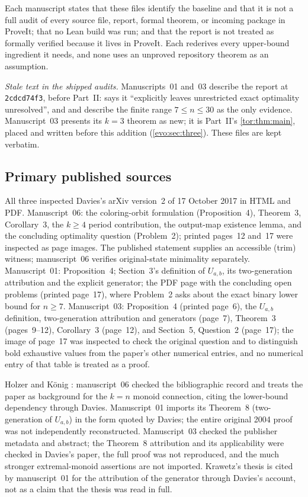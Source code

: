 \documentclass[11pt,a4paper]{article}
\numberwithin{equation}{section}
\theoremstyle{definition}
\theoremstyle{remark}
\begin{document}
Each manuscript states that these files identify the baseline and that it is
not a full audit of every source file, report, formal theorem, or incoming
package in ProveIt; that no Lean build was run; and that the report is not
treated as formally verified because it lives in ProveIt. Each rederives
every upper-bound ingredient it needs, and none uses an unproved repository
theorem as an assumption.

\emph{Stale text in the shipped audits.} Manuscripts~01 and~03 describe the
report at \texttt{2cdcd74f3}, before Part~II: 
says it ``explicitly leaves unrestricted exact optimality unresolved'', and
 and  describe
the finite range $7\le n\le30$ as the only evidence. Manuscript~03 presents
its $k=3$ theorem as new; it is Part~II's \cref{tor:thm:main}, placed and
written before this addition (\cref{evo:sec:three}). These files are kept
verbatim.

\subsection{Primary published sources}

All three inspected Davies's arXiv version~2 of 17 October 2017
\cite{Davies2017} in HTML and PDF. Manuscript~06: the coloring-orbit
formulation (Proposition~4), Theorem~3, Corollary~3, the $k\ge4$ period
contribution, the output-map existence lemma, and the concluding optimality
question (Problem~2); printed pages~12 and~17 were inspected as page images.
The published statement supplies an accessible (trim) witness; manuscript~06
verifies original-state minimality separately. Manuscript~01: Proposition~4;
Section~3's definition of $U_{a,b}$, its two-generation attribution and the
explicit generator; the PDF page with the concluding open problems (printed
page~17), where Problem~2 asks about the exact binary lower bound for
$n\ge7$. Manuscript~03: Proposition~4 (printed page~6), the $U_{a,b}$
definition, two-generation attribution and generators (page~7), Theorem~3
(pages~9--12), Corollary~3 (page~12), and Section~5, Question~2 (page~17);
the image of page~17 was inspected to check the original question and to
distinguish bold exhaustive values from the paper's other numerical entries,
and no numerical entry of that table is treated as a proof.

Holzer and K\"onig \cite{HolzerKoenig2004}: manuscript~06 checked the
bibliographic record and treats the paper as background for the $k=n$
monoid connection, citing the lower-bound dependency through Davies.
Manuscript~01 imports its Theorem~8 (two-generation of $U_{a,b}$) in the form
quoted by Davies; the entire original 2004 proof was not independently
reconstructed. Manuscript~03 checked the publisher metadata and abstract; the
Theorem~8 attribution and its applicability were checked in Davies's paper,
the full proof was not reproduced, and the much stronger extremal-monoid
assertions are not imported. Krawetz's thesis \cite{Krawetz2003} is cited by
manuscript~01 for the attribution of the generator through Davies's account,
not as a claim that the thesis was read in full.
\end{document}

